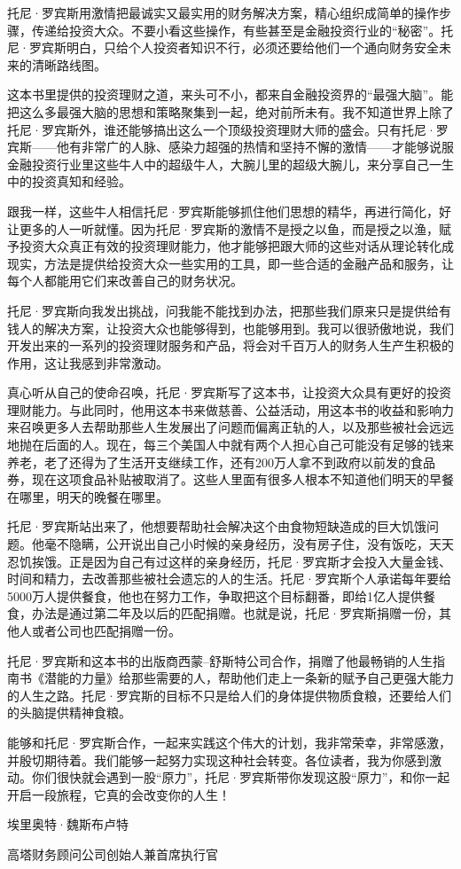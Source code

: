 托尼·罗宾斯用激情把最诚实又最实用的财务解决方案，精心组织成简单的操作步骤，传递给投资大众。不要小看这些操作，有些甚至是金融投资行业的“秘密”。托尼·罗宾斯明白，只给个人投资者知识不行，必须还要给他们一个通向财务安全未来的清晰路线图。

这本书里提供的投资理财之道，来头可不小，都来自金融投资界的“最强大脑”。能把这么多最强大脑的思想和策略聚集到一起，绝对前所未有。我不知道世界上除了托尼·罗宾斯外，谁还能够搞出这么一个顶级投资理财大师的盛会。只有托尼·罗宾斯——他有非常广的人脉、感染力超强的热情和坚持不懈的激情——才能够说服金融投资行业里这些牛人中的超级牛人，大腕儿里的超级大腕儿，来分享自己一生中的投资真知和经验。

跟我一样，这些牛人相信托尼·罗宾斯能够抓住他们思想的精华，再进行简化，好让更多的人一听就懂。因为托尼·罗宾斯的激情不是授之以鱼，而是授之以渔，赋予投资大众真正有效的投资理财能力，他才能够把跟大师的这些对话从理论转化成现实，方法是提供给投资大众一些实用的工具，即一些合适的金融产品和服务，让每个人都能用它们来改善自己的财务状况。

托尼·罗宾斯向我发出挑战，问我能不能找到办法，把那些我们原来只是提供给有钱人的解决方案，让投资大众也能够得到，也能够用到。我可以很骄傲地说，我们开发出来的一系列的投资理财服务和产品，将会对千百万人的财务人生产生积极的作用，这让我感到非常激动。

真心听从自己的使命召唤，托尼·罗宾斯写了这本书，让投资大众具有更好的投资理财能力。与此同时，他用这本书来做慈善、公益活动，用这本书的收益和影响力来召唤更多人去帮助那些人生发展出了问题而偏离正轨的人，以及那些被社会远远地抛在后面的人。现在，每三个美国人中就有两个人担心自己可能没有足够的钱来养老，老了还得为了生活开支继续工作，还有200万人拿不到政府以前发的食品券，现在这项食品补贴被取消了。这些人里面有很多人根本不知道他们明天的早餐在哪里，明天的晚餐在哪里。

托尼·罗宾斯站出来了，他想要帮助社会解决这个由食物短缺造成的巨大饥饿问题。他毫不隐瞒，公开说出自己小时候的亲身经历，没有房子住，没有饭吃，天天忍饥挨饿。正是因为自己有过这样的亲身经历，托尼·罗宾斯才会投入大量金钱、时间和精力，去改善那些被社会遗忘的人的生活。托尼·罗宾斯个人承诺每年要给5000万人提供餐食，他也在努力工作，争取把这个目标翻番，即给1亿人提供餐食，办法是通过第二年及以后的匹配捐赠。也就是说，托尼·罗宾斯捐赠一份，其他人或者公司也匹配捐赠一份。

托尼·罗宾斯和这本书的出版商西蒙–舒斯特公司合作，捐赠了他最畅销的人生指南书《潜能的力量》给那些需要的人，帮助他们走上一条新的赋予自己更强大能力的人生之路。托尼·罗宾斯的目标不只是给人们的身体提供物质食粮，还要给人们的头脑提供精神食粮。

能够和托尼·罗宾斯合作，一起来实践这个伟大的计划，我非常荣幸，非常感激，并殷切期待着。我们能够一起努力实现这种社会转变。各位读者，我为你感到激动。你们很快就会遇到一股“原力”，托尼·罗宾斯带你发现这股“原力”，和你一起开启一段旅程，它真的会改变你的人生！

{\kaishu \hfill 埃里奥特·魏斯布卢特

\hfill 高塔财务顾问公司创始人兼首席执行官}
